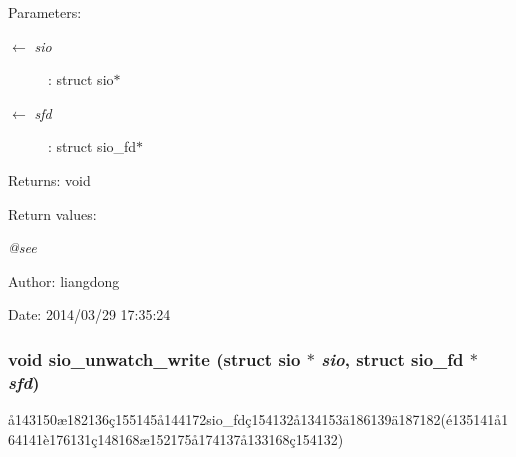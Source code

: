 \begin{Desc}
\item[Parameters:]
\begin{description}
\item[\mbox{$\leftarrow$} {\em sio}]: struct sio$\ast$ \item[\mbox{$\leftarrow$} {\em sfd}]: struct sio\_\-fd$\ast$ \end{description}
\end{Desc}
\begin{Desc}
\item[Returns:]void \end{Desc}
\begin{Desc}
\item[Return values:]
\begin{description}
\item[{\em @see}]\end{description}
\end{Desc}
\begin{Desc}
\item[Author:]liangdong \end{Desc}
\begin{Desc}
\item[Date:]2014/03/29 17:35:24 \end{Desc}
\subsubsection{\setlength{\rightskip}{0pt plus 5cm}void sio\_\-unwatch\_\-write (struct sio $\ast$ {\em sio}, struct sio\_\-fd $\ast$ {\em sfd})}\label{sio_8h_a10}


\aa{}143150\ae{}182136\c{c}155145\aa{}144172sio\_\-fd\c{c}154132\aa{}134153\"{a}186139\"{a}187182(\'{e}135141\aa{}164141\`{e}176131\c{c}148168\ae{}152175\aa{}174137\aa{}133168\c{c}154132) 

